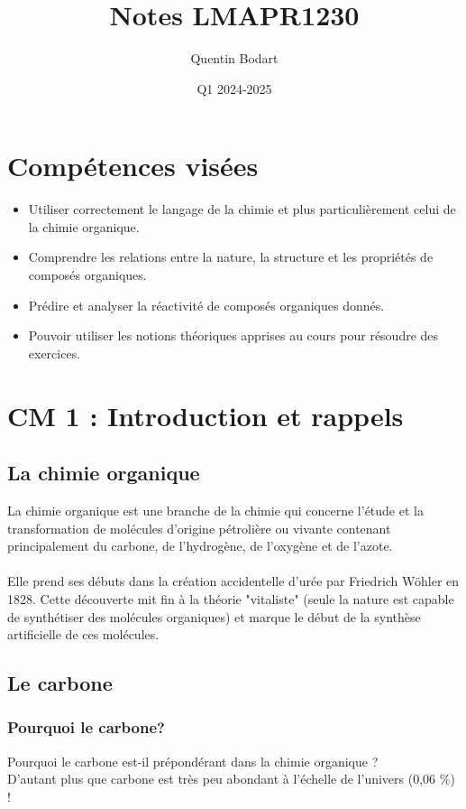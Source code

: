 \documentclass{article}
\title{Notes LMAPR1230}
\author{Quentin Bodart}
\date{Q1 2024-2025}
\begin{document}
\maketitle
\tableofcontents
\pagebreak

\section*{Compétences visées}
    \begin{itemize}
        \item Utiliser correctement le langage de la chimie et plus
        particulièrement celui de la chimie organique.
        \item Comprendre les relations entre la nature, la
        structure et les propriétés de composés organiques.
        \item Prédire et analyser la réactivité de composés
        organiques donnés.
        \item Pouvoir utiliser les notions théoriques apprises au
        cours pour résoudre des exercices.
    \end{itemize}

\section{CM 1 : Introduction et rappels}
    \subsection{La chimie organique}
        La chimie organique est une branche de la chimie qui concerne
        l’étude et la transformation de molécules d’origine pétrolière ou
        vivante contenant principalement
        du carbone, de l’hydrogène, de l’oxygène et de l’azote.\\\\
        Elle prend ses débuts dans la création accidentelle d'urée par Friedrich Wöhler en 1828.
        Cette découverte mit fin à la théorie "vitaliste" (seule la nature est capable de synthétiser des molécules organiques) 
        et marque le début de la synthèse artificielle de ces molécules.

    \subsection{Le carbone}
        \subsubsection{Pourquoi le carbone?}
            Pourquoi le carbone est-il prépondérant dans la chimie organique ? \\
            D'autant plus que carbone est très peu abondant à l'échelle de l'univers (0,06 \%) !
\end{document}

